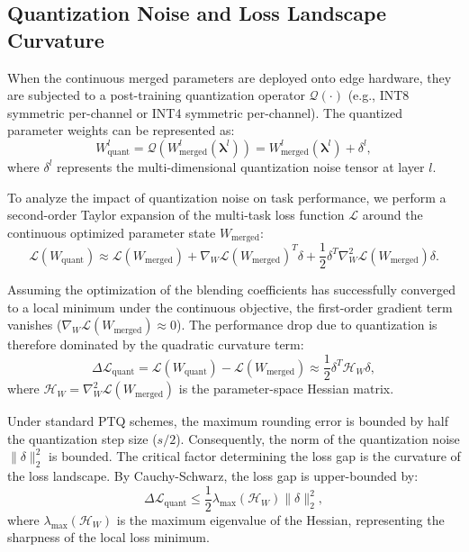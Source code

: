 \subsection{Quantization Noise and Loss Landscape Curvature}
When the continuous merged parameters are deployed onto edge hardware, they are subjected to a post-training quantization operator $\mathcal{Q}(\cdot)$ (e.g., INT8 symmetric per-channel or INT4 symmetric per-channel). The quantized parameter weights can be represented as:
\begin{equation}
    W_{\text{quant}}^l = \mathcal{Q}\left(W_{\text{merged}}^l(\boldsymbol{\lambda}^l)\right) = W_{\text{merged}}^l(\boldsymbol{\lambda}^l) + \delta^l,
\end{equation}
where $\delta^l$ represents the multi-dimensional quantization noise tensor at layer $l$.

To analyze the impact of quantization noise on task performance, we perform a second-order Taylor expansion of the multi-task loss function $\mathcal{L}$ around the continuous optimized parameter state $W_{\text{merged}}$:
\begin{equation}
    \mathcal{L}(W_{\text{quant}}) \approx \mathcal{L}(W_{\text{merged}}) + \nabla_W \mathcal{L}(W_{\text{merged}})^T \delta + \frac{1}{2} \delta^T \nabla^2_W \mathcal{L}(W_{\text{merged}}) \delta.
\end{equation}

Assuming the optimization of the blending coefficients has successfully converged to a local minimum under the continuous objective, the first-order gradient term vanishes ($\nabla_W \mathcal{L}(W_{\text{merged}}) \approx 0$). The performance drop due to quantization is therefore dominated by the quadratic curvature term:
\begin{equation}
    \Delta \mathcal{L}_{\text{quant}} = \mathcal{L}(W_{\text{quant}}) - \mathcal{L}(W_{\text{merged}}) \approx \frac{1}{2} \delta^T \mathcal{H}_W \delta,
\end{equation}
where $\mathcal{H}_W = \nabla^2_W \mathcal{L}(W_{\text{merged}})$ is the parameter-space Hessian matrix. 

Under standard PTQ schemes, the maximum rounding error is bounded by half the quantization step size ($s/2$). Consequently, the norm of the quantization noise $\|\delta\|_2^2$ is bounded. The critical factor determining the loss gap is the curvature of the loss landscape. By Cauchy-Schwarz, the loss gap is upper-bounded by:
\begin{equation}
    \Delta \mathcal{L}_{\text{quant}} \le \frac{1}{2} \lambda_{\max}(\mathcal{H}_W) \|\delta\|_2^2,
\end{equation}
where $\lambda_{\max}(\mathcal{H}_W)$ is the maximum eigenvalue of the Hessian, representing the sharpness of the local loss minimum.

